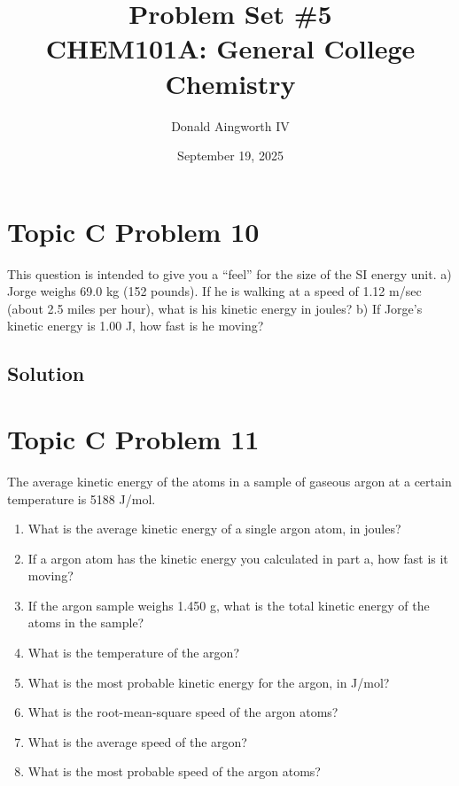 \documentclass[10pt]{article}
\title{
    Problem Set \#5
    \\  \small
    CHEM101A: General College Chemistry
    }
\author{Donald Aingworth IV}
\date{September 19, 2025}
\begin{document}

    \maketitle

    \setcounter{section}{9}

    \pagebreak
    \section{Topic C Problem 10}
        This question is intended to give you a “feel” for the size of the SI energy unit.
        a) Jorge weighs 69.0 kg (152 pounds). If he is walking at a speed of 1.12 m/sec (about 2.5 miles per hour), what is his kinetic energy in joules? 
        b) If Jorge's kinetic energy is 1.00 J, how fast is he moving?

        \subsection{Solution}

    \pagebreak
    \section{Topic C Problem 11}
        The average kinetic energy of the atoms in a sample of gaseous argon at a certain temperature is 5188 J/mol.
        \begin{enumerate} [label=\alph*)]
            \item What is the average kinetic energy of a single argon atom, in joules?
            \item If a argon atom has the kinetic energy you calculated in part a, how fast is it moving?
            \item If the argon sample weighs 1.450 g, what is the total kinetic energy of the atoms in the sample?
            \item What is the temperature of the argon?
            \item What is the most probable kinetic energy for the argon, in J/mol?
            \item What is the root-mean-square speed of the argon atoms?
            \item What is the average speed of the argon?
            \item What is the most probable speed of the argon atoms?
        \end{enumerate}
\end{document}
